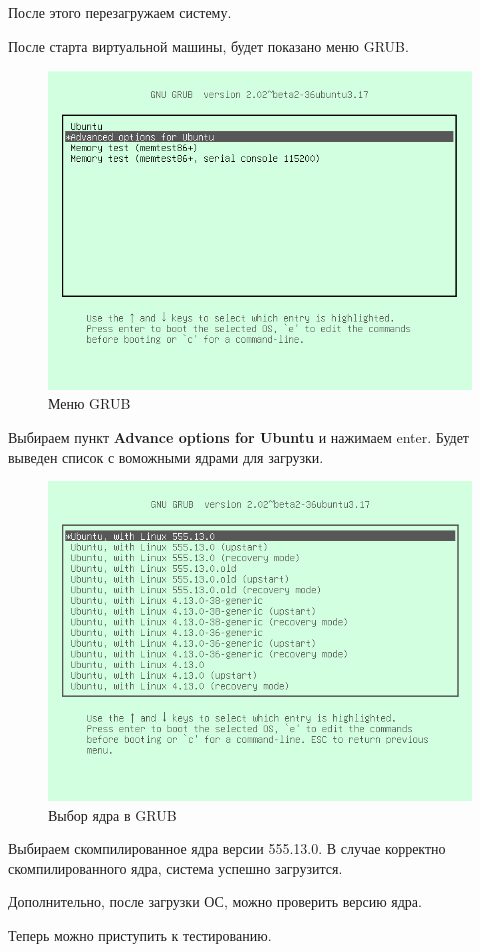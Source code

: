 После этого перезагружаем систему. 

После старта виртуальной машины, будет показано меню GRUB.

\begin{figure}[H]
  \centering
  \includegraphics[width=.8\textwidth]{img/grub_1}
  \caption{Меню GRUB}
\end{figure}

Выбираем пункт \textbf{Advance options for Ubuntu} и нажимаем enter. Будет выведен список с воможными ядрами для загрузки.

\begin{figure}[H]
  \centering
  \includegraphics[width=.8\textwidth]{img/grub_2}
  \caption{Выбор ядра в GRUB}
\end{figure}
Выбираем скомпилированное ядра версии 555.13.0. В случае корректно скомпилированного ядра, система успешно загрузится.

Дополнительно, после загрузки ОС, можно проверить версию ядра.

Теперь можно приступить к тестированию.

